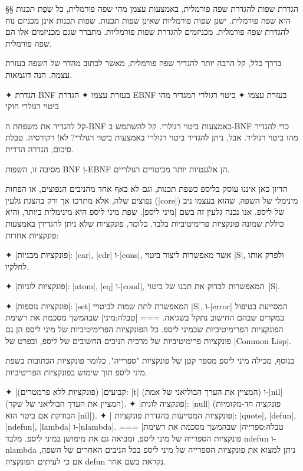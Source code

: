 \begin{editing}
§§ הגדרת שפות להגדרת שפה פורמלית, באמצעות עצמן
מהי שפה פורמלית, כל שְׂפַת תכנות היא שפה פורמלית. ישנן שפות פורמליות שאינן שפות תכנות.
שפות תכנות אינן מכניזם נוח להגדרת שפה פורמלית.
מכניזמים להגדרת שפות פורמליות. מתברר שגם מכניזמים אלו הם שפה פורמלית.

בדרך כלל, קל הרבה יותר להגדיר שפה פורמלית, מאשר לכתוב מהדר של השפה בעזרת עצמה.
הנה דוגמאות.
\begin{itemize}
✦ הגדרת BNF בעזרת עצמו
✦ הגדרת EBNF בעזרת עצמו
✦ ביטוי רגולרי המגדיר מהו ביטוי רגולרי חוקי
\end{itemize}
קל להגדיר את משפחת ה-BNF באמצעות ביטוי רגולרי.
קל להשתמש ב-BNF כדי להגדיר מהו ביטוי רגוליר.
אבל, ניתן להגדיר ביטוי רגולרי באמצעות ביטוי רגולרי? לא! רקורסיה.
טבלת סיכום, הגדרה הדדית.

מסיבה זו, השפות BNF וְ-EBNF הן אלגנטיות יותר מביטויים רגולריים.
\end{editing}

הדיון כאן איננו עוסק בליספ כשפת תכנות, וגם לא באף אחד מהניבים הנפוצים, או הפחות
נפוצים שלה, אלא מתרכז אך ורק בהצגת גלעין (\E|core|) מינימלי של השפה, שהוא בעצמו
ניב של ליספ. אנו נכנה גלעין זה בשם \ע|מיני ליספ|. שפת מיני ליספ היא מינימלית
ביותר, והיא כוללת שמונה פונקציות פרימיטיביות בלבד. כלומר, פונקציות שלא ניתן
להגדירן באמצעות פונקציות אחרות:

✦ \ע|פונקציות מבניות|: \E|car|, \E|cdr| ו-\E|cons|, אשר מאפשרות ליצור ביטוי
\E|S|, ולפרק אותו לחלקיו.

✦ \ע|פונקציות לוגיות|: \E|atom|, \E|eq| ו-\E|cond|, המאפשרות לבדוק את תכנו של
ביטוי~\E|S|.

✦ \ע|פונקציות נוספות|: \E|set| המאפשרת לתת שמות לביטויי \E|S|, ו-\E|error| המסייעת
בטיפול במקרים שבהם החישוב נתקל בשגיאה.
===
|טבלה:מיני| שבהמשך מסכמת את רשימת הפונקציות הפרימיטיביות שבמיני ליספ. כל
הפונקציות הפרימיטיביות של מיני ליספ הן גם פונקציות פרימיטיביות של מרבית הניבים החשובים
של ליספ, ובפרט של \E|Common Lisp|.

\normalsize
בנוסף, מכילה מיני ליספ מספר קטן של פונקציות "ספרייה", כלומר פונקציות הכתובות
בשפת מיני ליספ תוך שימוש בפונקציות הפריטיביות.

✦ \ע|קבועים| (פונקציות ללא פרמטרים): \E|t| (המציין את הערך הבוליאני של אמת) ו-\E|nil|
(המציין את הערך הבוליאני של שקר).
✦ \ע|פונקציה לוגית|: \E|null| (פונקציה חד-מקומיות הבודקת אם ביטוי הוא \E|nil|).
✦ \ע| פונקציות המסייעות בהגדרת פונקציות|:
\E|quote|, \E|defun|, \E|ndefun|, \E|lambda| ו-\E|nlambda|.
===
|טבלה:ספרייה| שבהמשך מסכמת את רשימת פונקציות הספרייה של מיני ליספ, ומביאה
גם את מימושן במיני ליספ. מלבד ndefun ו-nlambda ניתן למצוא את פונקציות הספרייה
של מיני ליספ בכל הניבים האחרים של השפה, אם כי לעיתים הפונקציה defun נקראת בשם
אחר.

